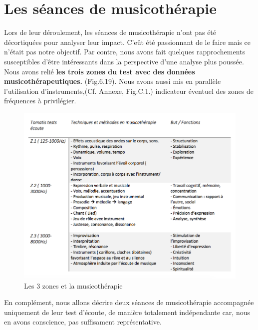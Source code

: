                \section{Les séances de musicothérapie}
               Lors de leur déroulement, les séances de
               musicothérapie n'ont pas été 
décortiquées pour analyser leur impact. C'eût
été passionnant de le faire mais ce n'était pas notre objectif.
Par contre, nous avons fait quelques rapprochements
susceptibles d'être intéressants dans la perspective d'une analyse plus
poussée. Nous avons  relié\textbf{ les trois zones du
test avec des données musicothérapeutiques.}
(Fig.6.19).
Nous avons aussi mis 
en parallèle  l'utilisation d'instruments,(Cf. Annexe, Fig.C.1.)
indicateur éventuel des zones de fréquences à
privilégier.
\begin{figure}
	\centering
	\includegraphics[width=1\linewidth]{images/testtechnmethbut}
	\caption[Zones du test avec la musicothérapie]{Les 3 
          zones et la musicothérapie}
       
	\label{testbutetfonction}
\end{figure}

 
   
En complément, nous allons décrire deux séances de
musicothérapie accompagnée uniquement de leur test d'écoute, de
manière totalement indépendante car, nous en avons conscience, pas
suffisament représentative.

